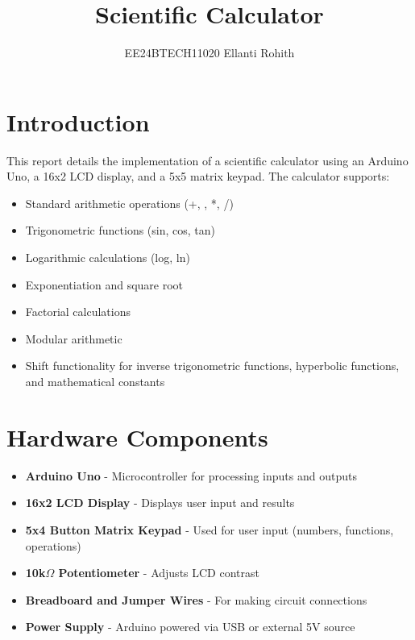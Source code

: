 \documentclass[journal,12pt,onecolumn]{IEEEtran}
\theoremstyle{remark}
\begin{document}

\vspace{3cm}

\title{Scientific Calculator}
\author{EE24BTECH11020    Ellanti Rohith}
\maketitle

\renewcommand{\thefigure}{\theenumi}
\renewcommand{\thetable}{\theenumi}



\section{Introduction}
This report details the implementation of a scientific calculator using an Arduino Uno, a 16x2 LCD display, and a 5x5 matrix keypad. The calculator supports:
\begin{itemize}
    \item Standard arithmetic operations (+,  , *, /)
    \item Trigonometric functions (sin, cos, tan)
    \item Logarithmic calculations (log, ln)
    \item Exponentiation and square root
    \item Factorial calculations
    \item Modular arithmetic
    \item Shift functionality for inverse trigonometric functions, hyperbolic functions, and mathematical constants
\end{itemize}

\section{Hardware Components}
\begin{itemize}
    \item \textbf{Arduino Uno} - Microcontroller for processing inputs and outputs
    \item \textbf{16x2 LCD Display} - Displays user input and results
    \item \textbf{5x4 Button Matrix Keypad} - Used for user input (numbers, functions, operations)
    \item \textbf{10k$\Omega$ Potentiometer} - Adjusts LCD contrast
    \item \textbf{Breadboard and Jumper Wires} - For making circuit connections
    \item \textbf{Power Supply} - Arduino powered via USB or external 5V source
\end{itemize}
\end{document}
